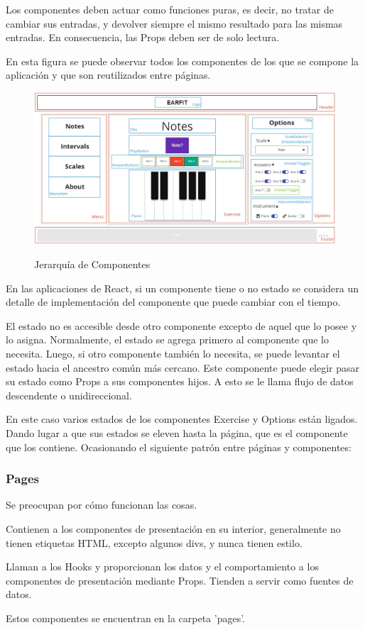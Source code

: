 \documentclass[12pt,twoside,titlepage]{report}
\begin{document}
Los componentes deben actuar como funciones puras, es decir, no tratar de cambiar sus entradas, y devolver siempre el mismo resultado para las mismas entradas. En consecuencia, las Props deben ser de solo lectura. 

En esta figura se puede observar todos los componentes de los que se compone la aplicación y que son reutilizados entre páginas.

\begin{figure}[H]
    \centering
    \includegraphics[scale=0.28]{Detalles de Implementación/JerarquíaComponentes}
    \label{fig:JerarquíaComponentes}
    \caption{Jerarquía de Componentes}
\end{figure}

En las aplicaciones de React, si un componente tiene o no estado se considera un detalle de implementación del componente que puede cambiar con el tiempo.

El estado no es accesible desde otro componente excepto de aquel que lo posee y lo asigna. Normalmente, el estado se agrega primero al componente que lo necesita. Luego, si otro componente también lo necesita, se puede levantar el estado hacia el ancestro común más cercano. Este componente puede elegir pasar su estado como Props a sus componentes hijos. A esto se le llama flujo de datos descendente o unidireccional. 

En este caso varios estados de los componentes Exercise y Options están ligados. Dando lugar a que sus estados se eleven hasta la página, que es el componente que los contiene. Ocasionando el siguiente patrón entre páginas y componentes:

\subsubsection{Pages}

\begin{compactitem}
    \item Se preocupan por cómo funcionan las cosas.
    \item Contienen a los componentes de presentación en su interior, generalmente no tienen etiquetas HTML, excepto algunos divs, y nunca tienen estilo.
    \item Llaman a los Hooks y proporcionan los datos y el comportamiento a los componentes de presentación mediante Props. Tienden a servir como fuentes de datos.
    \item Estos componentes se encuentran en la carpeta 'pages'.
\end{compactitem}
\end{document}
